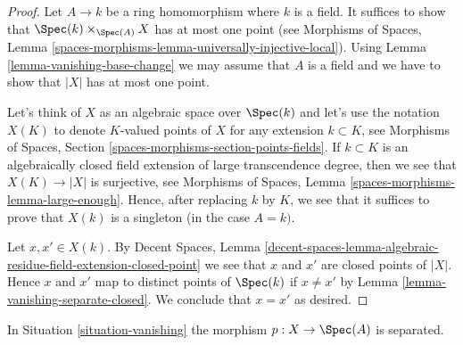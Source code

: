 \begin{proof}
Let $A \to k$ be a ring homomorphism where $k$ is a field. It suffices to
show that $\Spec(k) \times_{\Spec(A)} X$ has at most one point (see
Morphisms of Spaces, Lemma
\ref{spaces-morphisms-lemma-universally-injective-local}).
Using Lemma \ref{lemma-vanishing-base-change} we may assume that $A$
is a field and we have to show that $|X|$ has at most one point.

\medskip\noindent
Let's think of $X$ as an algebraic space over $\Spec(k)$ and let's
use the notation $X(K)$ to denote $K$-valued points of $X$
for any extension $k \subset K$, see
Morphisms of Spaces, Section \ref{spaces-morphisms-section-points-fields}.
If $k \subset K$ is an algebraically closed field extension
of large transcendence degree, then we see that $X(K) \to |X|$
is surjective, see Morphisms of Spaces, Lemma
\ref{spaces-morphisms-lemma-large-enough}. Hence, after replacing $k$
by $K$, we see that it suffices to prove that $X(k)$ is a singleton
(in the case $A = k)$.

\medskip\noindent
Let $x, x' \in X(k)$. By Decent Spaces, Lemma
\ref{decent-spaces-lemma-algebraic-residue-field-extension-closed-point}
we see that $x$ and $x'$ are closed points of $|X|$. Hence $x$ and $x'$
map to distinct points of $\Spec(k)$ if $x \not = x'$ by
Lemma \ref{lemma-vanishing-separate-closed}. We conclude that
$x = x'$ as desired.
\end{proof}

\begin{lemma}
\label{lemma-vanishing-separated}
In Situation \ref{situation-vanishing} the morphism $p : X \to \Spec(A)$ is
separated.
\end{lemma}

